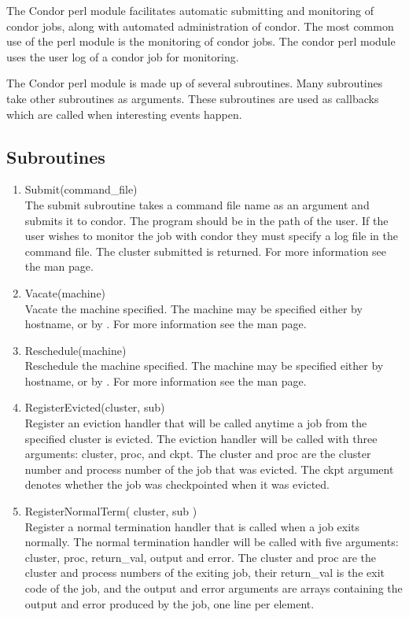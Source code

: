 The Condor perl module facilitates automatic submitting and monitoring of
condor jobs, along with automated administration of condor.  The most common
use of the perl module is the monitoring of condor jobs.  The condor perl
module uses the user log of a condor job for monitoring.

The Condor perl module is made up of several subroutines.  Many subroutines 
take other subroutines as arguments.  These subroutines are used as callbacks
which are called when interesting events happen.

\subsection{Subroutines}
\begin{enumerate}
	\item Submit(command\_file) \\
	The submit subroutine takes a command file name as an argument and
	submits it to condor.  The  program should be in the
	path of the user.  If the user wishes to monitor the job with condor
	they must specify a log file in the command file.  The cluster
	submitted is returned. For more information
	see the  man page.
	
	\item Vacate(machine) \\
	Vacate the machine specified.  The machine may be specified
	either by hostname, or by .  For more information
	see the  man page.

	\item Reschedule(machine) \\
	Reschedule the machine specified.  The machine may be specified either
 	by hostname, or by .  For more information see
	the  man page.

	\item RegisterEvicted(cluster, sub) \\
	Register an eviction handler that will be called anytime a job from
	the specified cluster is evicted.  The eviction handler will be
	called with three arguments: cluster, proc, and ckpt.  The cluster
	and proc are the cluster number and process number of the job that
	was evicted.  The ckpt argument denotes whether the job was 
	checkpointed when it was evicted.

	\item RegisterNormalTerm( cluster, sub ) \\
	Register a normal termination handler that is called when a job exits
	normally.  The normal termination handler will be called with five
	arguments: cluster, proc, return\_val, output and error.  The cluster
	and proc are the cluster and process numbers of the exiting job, 
	their return\_val is the exit code of the job, and the output and error
	arguments are arrays containing the output and error produced by the
	job, one line per element.


\end{enumerate}
